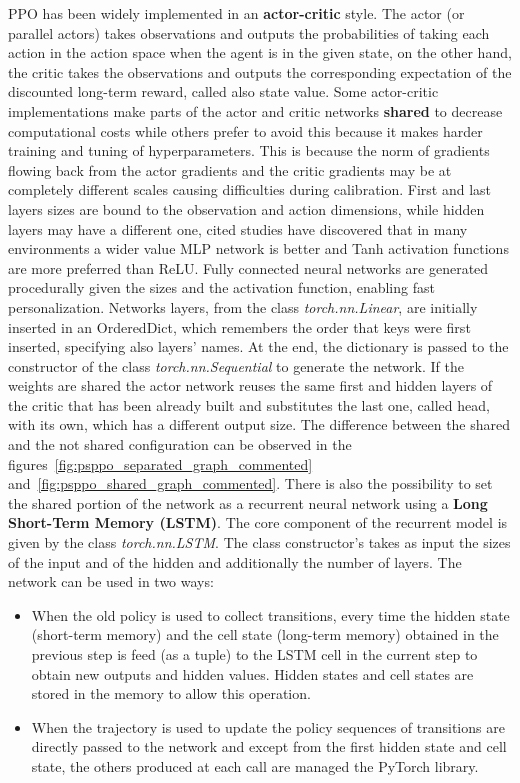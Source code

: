 \documentclass[11pt, a4paper, hidelinks]{report}
\begin{document}
PPO has been widely implemented in an \textbf{actor-critic} style.
The actor (or parallel actors) takes observations and outputs the probabilities of taking each action in the action space when the agent is in the given state, on the other hand, the critic takes the observations and outputs the corresponding expectation of the discounted long-term reward, called also state value.
Some actor-critic implementations make parts of the actor and critic networks \textbf{shared} to decrease computational costs while others prefer to avoid this because it makes harder training and tuning of hyperparameters.
This is because the norm of gradients flowing back from the actor gradients and the critic gradients may be at completely different scales causing difficulties during calibration.
First and last layers sizes are bound to the observation and action dimensions, while hidden layers may have a different one, cited studies have discovered that in many environments a wider value MLP network is better and Tanh activation functions are more preferred than ReLU\@.
Fully connected neural networks are generated procedurally given the sizes and the activation function, enabling fast personalization.
Networks layers, from the class \textit{torch.nn.Linear}, are initially inserted in an OrderedDict, which remembers the order that keys were first inserted, specifying also layers' names.
At the end, the dictionary is passed to the constructor of the class \textit{torch.nn.Sequential} to generate the network.
If the weights are shared the actor network reuses the same first and hidden layers of the critic that has been already built and substitutes the last one, called head, with its own, which has a different output size.
The difference between the shared and the not shared configuration can be observed in the figures~\ref{fig:psppo_separated_graph_commented} and~\ref{fig:psppo_shared_graph_commented}.
There is also the possibility to set the shared portion of the network as a recurrent neural network using a \textbf{Long Short-Term Memory (LSTM)}.
The core component of the recurrent model is given by the class \textit{torch.nn.LSTM}.
The class constructor's takes as input the sizes of the input and of the hidden and additionally the number of layers.
The network can be used in two ways:
\begin{itemize}
	\item When the old policy is used to collect transitions, every time the hidden state (short-term memory) and the cell state (long-term memory) obtained in the previous step is feed (as a tuple) to the LSTM cell in the current step to obtain new outputs and hidden values.
Hidden states and cell states are stored in the memory to allow this operation.
	\item When the trajectory is used to update the policy sequences of transitions are directly passed to the network and except from the first hidden state and cell state, the others produced at each call are managed the PyTorch library.
\end{itemize}
\end{document}
